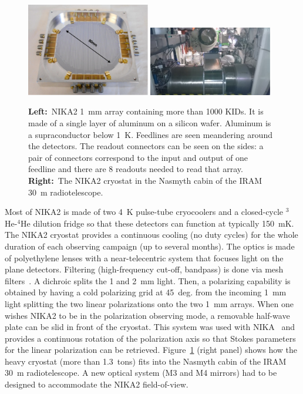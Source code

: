 \documentclass{sf2a-conf2016}
\begin{document}
\begin{figure}[ht!]
 \centering
 \includegraphics[width=0.48\textwidth,clip]{desert_fig1}%
 \includegraphics[width=0.48\textwidth,clip]{desert_fig2}      
 \caption{{\bf Left:}~NIKA2 1~mm array containing more than 1000 KIDs. It is
   made of a single layer of aluminum on a silicon wafer. Aluminum is a
   supraconductor below 1~K. Feedlines are seen meandering around the
   detectors. The readout connectors can be seen on the sides: a pair of
   connectors correspond to the input and output of one feedline and there are
   8 readouts needed to read that array. {\bf Right:}~The NIKA2 cryostat in
   the Nasmyth cabin of the IRAM 30~m radiotelescope. }
  \label{fig1-2}
\end{figure}


Most of NIKA2 is made of two 4~K pulse-tube cryocoolers and a closed-cycle
$^3$He-$^4$He dilution fridge so that these detectors can function at
typically 150~mK. The NIKA2 cryostat provides a continuous cooling (no duty
cycles) for the whole duration of each observing campaign (up to several
months). The optics is made of polyethylene lenses with a near-telecentric
system that focuses light on the plane detectors. Filtering (high-frequency
cut-off, bandpass) is done via mesh filters~\citep{2006SPIE.6275E..0UA}. A
dichroic splits the 1 and 2~mm light. Then, a polarizing capability is
obtained by having a cold polarizing grid at 45~deg. from the incoming 1~mm
light splitting the two linear polarizations onto the two 1~mm arrays. When
one wishes NIKA2 to be in the polarization observing mode, a removable
half-wave plate can be slid in front of the cryostat. This system was used
with NIKA~\citep{2016arXiv160902042R} and provides a continuous rotation of
the polarization axis so that Stokes parameters for the linear polarization
can be retrieved. Figure~\ref{fig1-2} (right panel) shows how the heavy
cryostat (more than 1.3~tons) fits into the Nasmyth cabin of the IRAM 30~m
radiotelescope. A new optical system (M3 and M4 mirrors) had to be designed to
accommodate the NIKA2 field-of-view.
\end{document}
